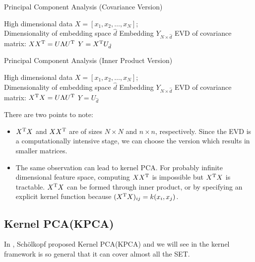 \begin{algorithm}[htb]
	\caption{Principal Component Analysis (Covariance Version)}
	\label{alg:pca_cov}
	\begin{algorithmic}[1]
		\REQUIRE High dimensional data $X = [x_1, x_2, \ldots, x_N]$; \\
			Dimensionality of embedding space $ \hat{d} $
		\ENSURE Embedding $ Y_{N \times \hat{d}} $
		\STATE EVD of covariance matrix: $ XX^\mathrm{T} = U \Lambda U^\mathrm{T} $
		\STATE $ Y = X^\mathrm{T} U_{\hat{d}} $
	\end{algorithmic}
\end{algorithm}

\begin{algorithm}[htb]
	\caption{Principal Component Analysis (Inner Product Version)}
	\label{alg:pca_in}
	\begin{algorithmic}[1]
		\REQUIRE High dimensional data $X = [x_1, x_2, \ldots, x_N]$; \\
			Dimensionality of embedding space $ \hat{d} $
		\ENSURE Embedding $ Y_{N \times \hat{d}} $
		\STATE EVD of covariance matrix: $ X^\mathrm{T}X = U \Lambda U^\mathrm{T} $
		\STATE $ Y = U_{\hat{d}} $
	\end{algorithmic}
\end{algorithm}

There are two points to note:
\begin{itemize}
	\item $ X^\mathrm{T}X $ and $ XX^\mathrm{T} $ are of sizes $ N \times N $ and 
	$ n \times n $, respectively. Since the EVD is a computationally 
	intensive stage, we can choose the version which results in smaller 
	matrices. 
	\item The same observation can lead to kernel PCA. For probably 
	infinite dimensional feature space, computing $ XX^\mathrm{T} $ 
	is impossible but $ X^\mathrm{T}X $ is tractable. $ X^\mathrm{T}X $
	can be formed through inner product, or by specifying an 
	explicit kernel function because $ (X^\mathrm{T}X)_{ij} = k(x_i,x_j) $. 
\end{itemize}

\subsection{Kernel PCA(KPCA)}
\label{sec:kpca}

In \cite{scholkopf1998kpca}, Sch{\"o}lkopf proposed 
Kernel PCA(KPCA) and we will see in \rsec{\ref{sec:kfx}}
the kernel framework is so general that it can 
cover almost all the SET. 


